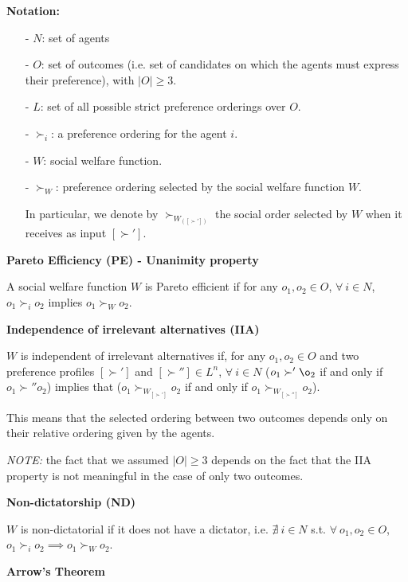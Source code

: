 \documentclass[pt11,a4paper,twoside,reqno,openright]{paper}
\begin{document}

\bigskip
\noindent \textbf{Notation:}
\begin{itemize}
	\item [-] $N$: set of agents
	\item [-] $O$: set of outcomes (i.e. set of candidates on which the agents 
	must express their preference), with $|O| \geq 3$.
	\item [-] $L$: set of all possible strict preference orderings over $O$.
	\item [-] $\succ_i$: a preference ordering for the agent $i$.
	\item [-] $W$: social welfare function.
	\item [-] $\succ_W$: preference ordering selected by the social welfare 
	function $W$.

	\noindent In particular, we denote by $\succ_{W_{([\succ'])}}$ the social 
	order selected by $W$ when it receives as input $[\succ']$.
\end{itemize}

\bigskip
\noindent \textbf{Pareto Efficiency (PE) - Unanimity property}

\noindent A social welfare function $W$ is Pareto efficient if for any $o_1, o_2 
\in O$, $\forall~i \in N$, $o_1 \succ_i o_2$ implies $o_1 \succ_W o_2$.

\bigskip
\noindent \textbf{Independence of irrelevant alternatives (IIA)}

\noindent $W$ is independent of irrelevant alternatives if, for any $o_1,o_2 
\in O$ and two preference profiles $[\succ']$ and $[\succ''] \in L^n$, 
$\forall~i \in N$ ($o_1 \succ' \o_2$ if and only if $o_1 \succ'' o_2$) implies 
that ($o_1 \succ_{W_{[\succ']}} o_2$ if and only if $o_1 \succ_{W_{[\succ'']}} 
o_2$).

\noindent This means that the selected ordering between two outcomes depends 
only on their relative ordering given by the agents.

\noindent \textit{NOTE:} the fact that we assumed $|O| \geq 3$ depends on the 
fact that the IIA property is not meaningful in the case of only two outcomes.

\bigskip
\noindent \textbf{Non-dictatorship (ND)}

\noindent $W$ is non-dictatorial if it does not have a dictator, i.e. 
$\nexists ~i \in N$ s.t. $\forall ~o_1,o_2 \in O$, $o_1 \succ_i o_2 \implies 
o_1 \succ_W o_2$.

\bigskip
\noindent \textbf{Arrow's Theorem}
\end{document}
